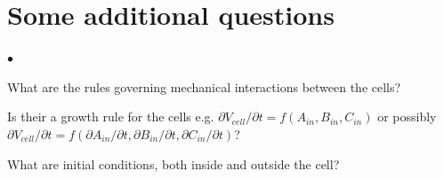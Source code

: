 \documentclass[12pt]{article}
\begin{document}
\section{Some additional questions}
\begin{list}{$\bullet$}{}
\item What are the rules governing mechanical interactions between the cells?
\item Is their a growth rule for the cells e.g. $\partial V_{cell}/\partial t = f(A_{in},
B_{in},C_{in})$ or possibly $\partial V_{cell}/\partial t = f(\partial A_{in}/\partial t,
\partial B_{in}/\partial t, \partial C_{in}/\partial t)$?
\item What are initial conditions, both inside and outside the cell?
\end{list}
\end{document}
